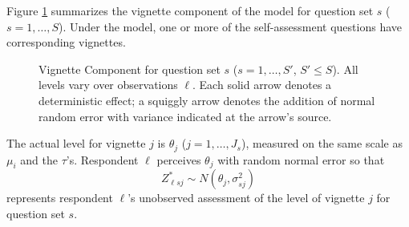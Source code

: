 \documentclass{amsart}
\begin{document}
Figure \ref{f:vign} summarizes the vignette component of the model for
question set $s$ ($s=1,\dots,S$).  Under the model, one or more of the
self-assessment questions have corresponding vignettes.
\begin{figure}[t]
  \begin{center}
  \end{center}
  \caption{\label{f:vign}Vignette Component for question set $s$
    ($s=1,\dots,S'$, $S'\leq S$).  All levels vary over observations
    $\ell$.  Each solid arrow denotes a deterministic effect; a
    squiggly arrow denotes the addition of normal random error with
    variance indicated at the arrow's source.}
\end{figure}

The actual level for vignette $j$ is $\theta_j$ ($j=1,\dots,J_s$),
measured on the same scale as $\mu_i$ and the $\tau$'s.  Respondent
$\ell$ perceives $\theta_j$ with random normal error so that
\begin{equation}
  \label{stoch-v}
  Z_{{\ell}sj}^* \sim N(\theta_j,\sigma^2_{sj})
\end{equation}
represents respondent ${\ell}$'s unobserved assessment of the level of
vignette $j$ for question set $s$.
\end{document}
